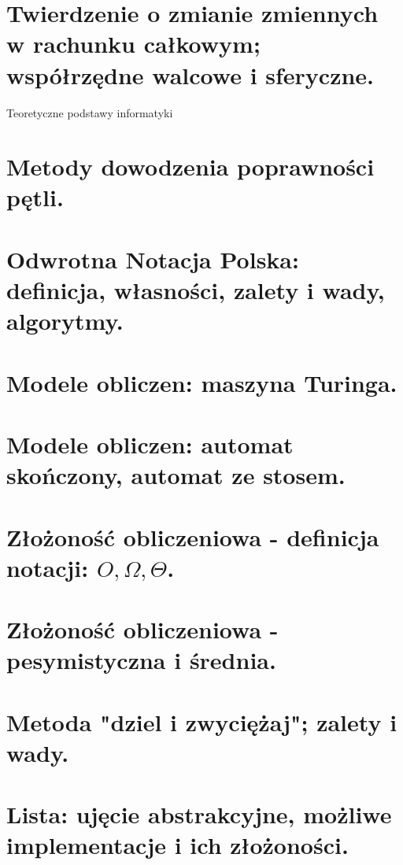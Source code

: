 \documentclass[12pt]{article}
\begin{document}
    \section{Twierdzenie o zmianie zmiennych w rachunku całkowym; współrzędne walcowe i sferyczne.}

    \newpage

    \begin{center}
    {\LARGE Teoretyczne podstawy informatyki}
    \end{center}

    \section{Metody dowodzenia poprawności pętli.}
    \section{Odwrotna Notacja Polska: definicja, własności, zalety i wady, algorytmy.}
    \section{Modele obliczen: maszyna Turinga.}
    \section{Modele obliczen: automat skończony, automat ze stosem.}

    \newpage

    \section{Złożoność obliczeniowa - definicja notacji: $O, \Omega, \Theta$.}

    \newpage

    \section{Złożoność obliczeniowa - pesymistyczna i średnia.}

    \newpage

    \section{Metoda "dziel i zwyciężaj"; zalety i wady.}
    \section{Lista: ujęcie abstrakcyjne, możliwe implementacje i ich złożoności.}
\end{document}

